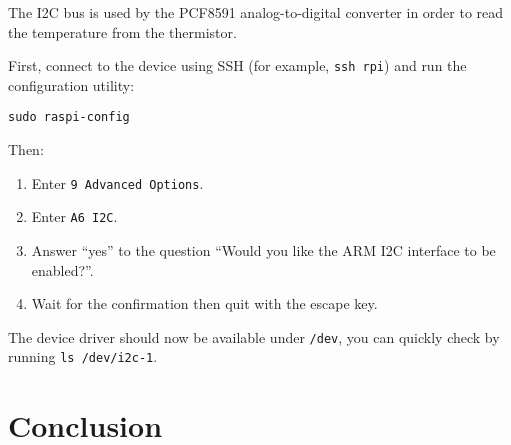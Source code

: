 \documentclass[11pt,a4paper]{article}
\begin{document}
The I2C bus is used by the PCF8591 analog-to-digital converter in order to read the temperature from the thermistor.

First, connect to the device using SSH (for example, \texttt{ssh rpi}) and run the configuration utility:
\begin{verbatim}
sudo raspi-config
\end{verbatim}

Then:
\begin{enumerate}
  \item Enter \texttt{9 Advanced Options}.
  \item Enter \texttt{A6 I2C}.
  \item Answer ``yes'' to the question ``Would you like the ARM I2C interface to be enabled?''.
  \item Wait for the confirmation then quit with the escape key.
\end{enumerate}

The device driver should now be available under \texttt{/dev}, you can quickly check by running \texttt{ls /dev/i2c-1}.

\section*{Conclusion}

\end{document}
